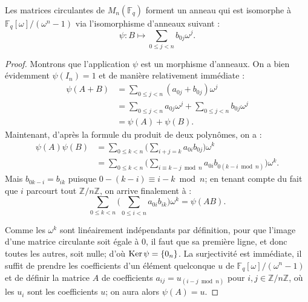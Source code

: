 \documentclass[a4paper]{article} %
\numberwithin{section}{part}
\numberwithin{equation}{section}
\newcommand\zmodn[1]{\mathbb{Z}/#1\mathbb{Z}}
\newcommand\GF[1]{\mathbb{F}_{#1}}
\begin{document}
\begin{thm}
\label{th:matcirciso}
Les matrices circulantes de $M_n(\GF{q})$ forment un anneau qui est isomorphe à 
$\mathbb{F}_q[\omega]/(\omega^n - 1)$ \textup{via} l'isomorphisme d'anneaux
suivant :
\begin{equation*}
\label{eq:isomconvert}
\psi : B \longmapsto \sum_{0\leq j < n}{b_{0j}\omega^j}.
\end{equation*}
\end{thm}
\begin{proof}
Montrons que l'application $\psi$ est un morphisme d'anneaux. On a bien 
évidemment $\psi(I_n) = 1$ et de manière relativement immédiate :
\begin{align*}
\psi(A + B) &= \sum_{0\leq j < n}{(a_{0j} + b_{0j})\omega^j}\\
&= \sum_{0\leq j < n}{a_{0j}\omega^j} + \sum_{0\leq j < n}{b_{0j}\omega^j}\\
&= \psi(A) + \psi(B).
\end{align*}
Maintenant, d'après la formule du produit de deux polynômes, on a :
\begin{align*}
\psi(A)\psi(B) &= \sum_{0\leq k < n}
{\bigg(\sum_{i+j=k}{a_{0i}b_{0j}}\bigg)\omega^k}\\
&= \sum_{0\leq k < n}{\bigg(\sum_{i\equiv k-j \bmod n}{a_{0i}b_{0(k-i \bmod n)}}
\bigg)\omega^k}.
\end{align*}
Mais $b_{0k-i} = b_{ik}$ puisque $0 -(k-i) \equiv i-k \bmod n$; en tenant compte
du fait que $i$ parcourt tout $\zmodn{n}$, on arrive finalement à :
\[\sum_{0\leq k < n}{\bigg(\sum_{0\leq i < n}{a_{0i}b_{ik}}\bigg)\omega^k} = 
\psi(AB).\]\par
Comme les $\omega^k$ sont linéairement indépendants par définition, pour que 
l'image d'une matrice circulante soit égale à $0$, il faut que sa première 
ligne, et donc toutes les autres, soit nulle; d'où $\textup{Ker}\,\psi = 
\{0_n\}$. La surjectivité est immédiate, il suffit de prendre les coefficients 
d'un élément quelconque $u$ de $\GF{q}[\omega]/(\omega^n - 1)$ et de définir la 
matrice $A$ de coefficients $a_{ij} = u_{(i-j \bmod n)}$ pour $i,j\in\zmodn{n}$,
où les $u_i$ sont les coefficients $u$; on aura alors $\psi(A) = u$.
\end{proof}
\end{document}
